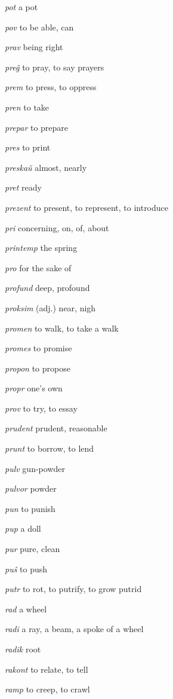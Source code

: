 \begin{landscape}
\begin{multicols}{5}
\begin{outdent}{1em}
\emph{pot}  a pot

\emph{pov}  to be able, can

\emph{prav}  being right

\emph{preĝ}  to pray, to say prayers

\emph{prem}  to press, to oppress

\emph{pren}  to take

\emph{prepar } to prepare

\emph{pres}  to print

\emph{preskaŭ}  almost, nearly

\emph{pret}  ready

\emph{prezent}  to present, to represent, to introduce

\emph{pri}  concerning, on, of, about

\emph{printemp}  the spring

\emph{pro}  for the sake of 

\emph{profund}  deep, profound

\emph{proksim}  (adj.) near, nigh

\emph{promen } to walk, to take a walk

\emph{promes}  to promise

\emph{propon}  to propose

\emph{propr}  one’s own

\emph{prov}  to try, to essay

\emph{prudent}  prudent, reasonable

\emph{prunt}  to borrow, to lend

\emph{pulv}  gun-powder

\emph{pulvor}  powder

\emph{pun}  to punish

\emph{pup}  a doll

\emph{pur}  pure, clean

\emph{puŝ}  to push

\emph{putr}  to rot, to putrify, to grow putrid
\end{outdent}


\begin{outdent}{1em}
\emph{rad}  a wheel

\emph{radi}  a ray, a beam, a spoke of a wheel

\emph{radik}  root

\emph{rakont}  to relate, to tell

\emph{ramp } to creep, to crawl


\end{outdent}
\end{multicols}
\end{landscape}
